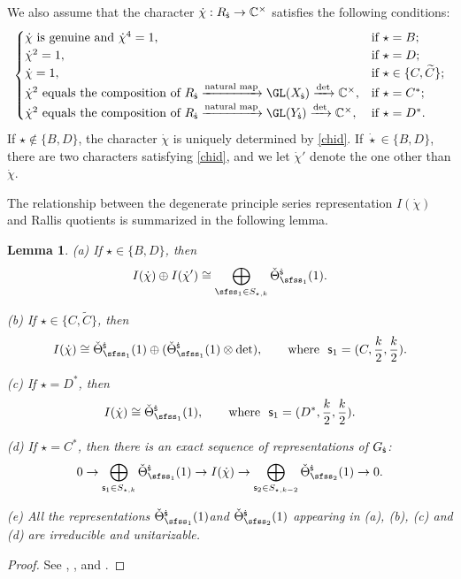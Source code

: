 \documentclass[12pt,a4paper]{amsart}
\newcommand{\be}{\begin {equation}}
\newcommand{\ee}{\end {equation}}
\numberwithin{equation}{section}
\newtheorem{lem}[thm]{Lemma}
\theoremstyle{remark}
\begin{document}
We also assume that the character $\dot \chi: R_{{\dot{\mathsf s}}}\rightarrow \mathbb{C}^\times $
satisfies  the following conditions:
\be\label{chid}
\begin{cases}
 \dot \chi \textrm{ is genuine and $\dot \chi^4=1$,}& \textrm{if $ \star=B$};\\
 \dot \chi^2=1,  & \textrm{if $\star=D$;}\\
 \dot \chi=1,\quad   &\textrm{if } \star\in \{C,\widetilde C\};\\
    \dot \chi^2\textrm{ equals the composition of $R_\dsfss\xrightarrow{\textrm{natural map}} \GL(X_\dsfss)\xrightarrow{\det}\C^\times$},  & \textrm{if $ \star=C^*$;}\\
 \dot \chi^2\textrm{ equals the composition of $R_\dsfss\xrightarrow{\textrm{natural map}} \GL(Y_\dsfss)\xrightarrow{\det}\C^\times$},  & \textrm{if $ \star=D^*$.}
\end{cases}
\ee
If  $\star\notin \{B,D\}$, the character   $\dot{\chi}$ is uniquely determined by \eqref{chid}.
If  $\dot \star\in \{B,D\}$, there are two characters satisfying \eqref{chid}, and we let $\dot \chi'$ denote the one other than $\dot \chi$.


The relationship between the degenerate principle series representation $I(\dot{\chi})$ and
Rallis quotients is summarized in the following lemma.
\begin{lem}\label{degens}%
\noindent
(a) If $\star\in \{B,D\}$,  then
\[
  I(\dot{\chi}) \oplus I(\dot \chi')\cong \bigoplus_{\sfss_1\in S_{\star, k}}
   \check \Theta_{\sfss_1}^{\dsfss}(1).
\]

\noindent
(b) If $\star\in \{C,\widetilde C\}$, then
\[
  I(\dot{\chi})\cong \check \Theta_{\sfss_1}^{\dsfss}(1)\oplus  (\check \Theta_{\sfss_1}^{\dsfss}(1)\otimes \det),\qquad \textrm{where } \ \mathsf s_1=(C, \frac{k}{2}, \frac{k}{2}).
\]


\noindent
(c) If $\star=D^*$, then
\[
  I(\dot{\chi})\cong \check \Theta_{\sfss_1}^{\dsfss}(1),\qquad \textrm{where }\ \mathsf s_1=(D^*,  \frac{k}{2}, \frac{k}{2}).
\]


\noindent
(d) If $\star=C^*$, then there is an exact sequence of representations of $G_{{\dot{\mathsf s}}}$:
\[
0\rightarrow \bigoplus_{\mathsf s_1\in S_{\star, k}} \check \Theta_{\sfss_1}^{\dsfss}(1) \rightarrow
 I(\dot{\chi})\rightarrow  \bigoplus_{\mathsf s_2\in S_{\star, k-2}} \check \Theta_{\sfss_2}^{\dsfss}(1) \rightarrow 0.
\]

\noindent
(e) All the representations $ \check \Theta_{\sfss_1}^{\dsfss}(1) $and $ \check \Theta_{\sfss_2}^{\dsfss}(1)$ appearing in (a), (b), (c) and (d) are irreducible and unitarizable.


\end{lem}
\begin{proof}
 See \cite[Theorem 2.4]{Ku}, \cite[Introduction]{LZ1}, \cite[Theorem 6.1]{LZ2} and  \cite[Sections 9 and 10]{Ya}.
\end{proof}
\end{document}
